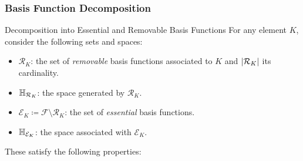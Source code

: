 \begin{frame}
\frametitle{Basis Function Decomposition}
    \begin{block}{Decomposition into Essential and Removable Basis Functions}
        For any element $K$, consider the following sets and spaces:
        \begin{itemize}
            \item $\mathcal{R}_K$: the set of \emph{removable} basis functions associated to $K$ and $\left|\mathcal{R}_K\right|$ its cardinality.
            \item $\mathbb{H}_{\mathcal{R}_K}$: the space generated by $\mathcal{R}_K$.
            \item $\mathcal{E}_K \coloneqq \mathcal{F} \setminus \mathcal{R}_K$: the set of \emph{essential} basis functions.
            \item $\mathbb{H}_{\mathcal{E}_K}$: the space associated with $\mathcal{E}_K$.
        \end{itemize}

    \end{block}
    These satisfy the following properties:

    \begin{center}
    \end{center}
\end{frame}

